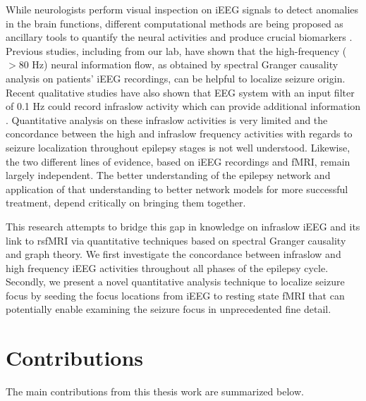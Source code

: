 
While neurologists perform visual inspection on iEEG signals to detect anomalies in the brain functions, different computational methods are being proposed as ancillary tools to quantify the neural activities and produce crucial biomarkers \citep{bartolomei2017defining, smith2021accuracy}. Previous studies, including from our lab, have shown that the high-frequency ($> 80$ Hz) neural information flow, as obtained by spectral Granger causality analysis on patients’ iEEG recordings, can be helpful to localize seizure origin. Recent qualitative studies have also shown that EEG system with an input filter of 0.1 Hz could record infraslow activity which can provide additional information \citep{rampp2012ictal}. Quantitative analysis on these infraslow activities is very limited and the concordance between the high and infraslow frequency activities with regards to seizure localization throughout epilepsy stages is not well understood. Likewise, the two different lines of evidence, based on iEEG recordings and fMRI, remain largely independent. The better understanding of the epilepsy network and application of that understanding to better network models for more successful treatment, depend critically on bringing them together.

This research attempts to bridge this gap in knowledge on infraslow iEEG and its link to rsfMRI via quantitative techniques based on spectral Granger causality and graph theory. We first investigate the concordance between infraslow and high frequency iEEG activities throughout all phases of the epilepsy cycle. Secondly, we present a novel quantitative analysis technique to localize seizure focus by seeding the focus locations from iEEG to resting state fMRI that can potentially enable examining the seizure focus in unprecedented fine detail. 

\section{Contributions}
The main contributions from this thesis work are summarized below.

